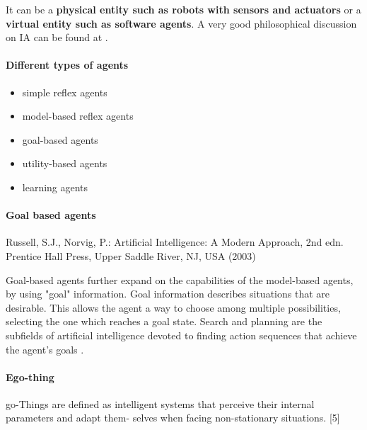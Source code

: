\documentclass{article}
\begin{document}
	 It can be a \textbf{physical entity such as robots with sensors and actuators} or a\textbf{ virtual entity such as software agents}. A very good philosophical discussion on IA can be found at \cite{ngobye-2010-types-and-priorities-of-multi-agent-system-interactions}.
	 
	 
	 
	 \paragraph{Different types of agents}
	 	\begin{itemize}
	 		\item simple reflex agents
	 		\item model-based reflex agents
	 		\item goal-based agents
	 		\item utility-based agents
	 		\item learning agents
	 	\end{itemize}
	 	\paragraph{Goal based agents}
	 	Russell, S.J., Norvig, P.: Artificial Intelligence: A Modern Approach,
	 	2nd edn. Prentice Hall Press, Upper Saddle River, NJ, USA (2003)
	 	
	 	Goal-based agents further expand on the capabilities of the model-based agents, by using "goal" information. Goal information describes situations that are desirable. This allows the agent a way to choose among multiple possibilities, selecting the one which reaches a goal state. Search and planning are the subfields of artificial intelligence devoted to finding action sequences that achieve the agent's goals \cite{wikipedia-2020-intelligent-agent}.
	 
	 \paragraph{Ego-thing} go-Things are defined as intelligent
	 systems that perceive their internal parameters and adapt them-
	 selves when facing non-stationary situations. \citet{kanapram-2019-dynamic-bayesian-approach-for-decision-making-in-ego-things}[5]
	 
\end{document}
